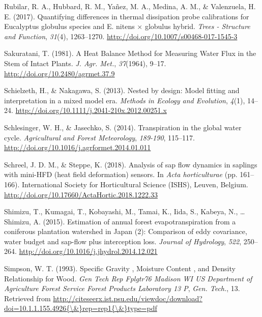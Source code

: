 \documentclass[11pt,twoside]{reedthesis}
\begin{document}
\hypertarget{ref-Rubilar2017}{}
Rubilar, R. A., Hubbard, R. M., Yañez, M. A., Medina, A. M., \&
Valenzuela, H. E. (2017). Quantifying differences in thermal dissipation
probe calibrations for Eucalyptus globulus species and E. nitens ×
globulus hybrid. \emph{Trees - Structure and Function}, \emph{31}(4),
1263--1270. \url{http://doi.org/10.1007/s00468-017-1545-3}

\hypertarget{ref-Sakuratani1981}{}
Sakuratani, T. (1981). A Heat Balance Method for Measuring Water Flux in
the Stem of Intact Plants. \emph{J. Agr. Met.}, \emph{37}(1964), 9--17.
\url{http://doi.org/10.2480/agrmet.37.9}

\hypertarget{ref-Schielzeth2013}{}
Schielzeth, H., \& Nakagawa, S. (2013). Nested by design: Model fitting
and interpretation in a mixed model era. \emph{Methods in Ecology and
Evolution}, \emph{4}(1), 14--24.
\url{http://doi.org/10.1111/j.2041-210x.2012.00251.x}

\hypertarget{ref-Schlesinger2014}{}
Schlesinger, W. H., \& Jasechko, S. (2014). Transpiration in the global
water cycle. \emph{Agricultural and Forest Meteorology}, \emph{189-190},
115--117. \url{http://doi.org/10.1016/j.agrformet.2014.01.011}

\hypertarget{ref-Schreel2018}{}
Schreel, J. D. M., \& Steppe, K. (2018). Analysis of sap flow dynamics
in saplings with mini-HFD (heat field deformation) sensors. In
\emph{Acta horticulturae} (pp. 161--166). International Society for
Horticultural Science (ISHS), Leuven, Belgium.
\url{http://doi.org/10.17660/ActaHortic.2018.1222.33}

\hypertarget{ref-Shimizu2015}{}
Shimizu, T., Kumagai, T., Kobayashi, M., Tamai, K., Iida, S., Kabeya,
N., \ldots{} Shimizu, A. (2015). Estimation of annual forest
evapotranspiration from a coniferous plantation watershed in Japan (2):
Comparison of eddy covariance, water budget and sap-flow plus
interception loss. \emph{Journal of Hydrology}, \emph{522}, 250--264.
\url{http://doi.org/10.1016/j.jhydrol.2014.12.021}

\hypertarget{ref-Simpson1993}{}
Simpson, W. T. (1993). Specific Gravity , Moisture Content , and Density
Relationship for Wood. \emph{Gen Tech Rep Fplgtr76 Madison WI US
Department of Agriculture Forest Service Forest Products Laboratory 13
P}, \emph{Gen. Tech.}, 13. Retrieved from
\href{http://citeseerx.ist.psu.edu/viewdoc/download?doi=10.1.1.155.4926\%7B/\&\%7Drep=rep1\%7B/\&\%7Dtype=pdf}{http://citeseerx.ist.psu.edu/viewdoc/download?doi=10.1.1.155.4926\{\textbackslash{}\&\}rep=rep1\{\textbackslash{}\&\}type=pdf}
\end{document}
